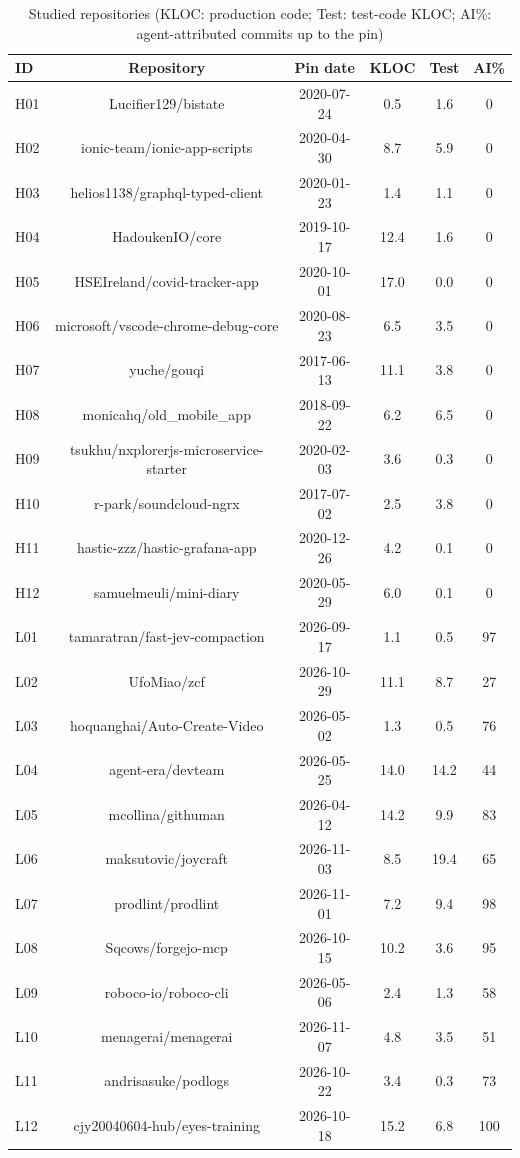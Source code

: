 \documentclass[10pt,conference]{IEEEtran}
\begin{document}
\begin{table}[t]
\caption{Studied repositories (KLOC: production code; Test: test-code KLOC; AI\%: agent-attributed commits up to the pin)}
\label{tab:dataset}
\centering
\scriptsize
\setlength{\tabcolsep}{2.5pt}
\begin{tabular}{lccccc}
\toprule
ID & Repository & Pin date & KLOC & Test & AI\% \\
\midrule
H01 & Lucifier129/bistate & 2020-07-24 & 0.5 & 1.6 & 0 \\
H02 & ionic-team/ionic-app-scripts & 2020-04-30 & 8.7 & 5.9 & 0 \\
H03 & helios1138/graphql-typed-client & 2020-01-23 & 1.4 & 1.1 & 0 \\
H04 & HadoukenIO/core & 2019-10-17 & 12.4 & 1.6 & 0 \\
H05 & HSEIreland/covid-tracker-app & 2020-10-01 & 17.0 & 0.0 & 0 \\
H06 & microsoft/vscode-chrome-debug-core & 2020-08-23 & 6.5 & 3.5 & 0 \\
H07 & yuche/gouqi & 2017-06-13 & 11.1 & 3.8 & 0 \\
H08 & monicahq/old\_mobile\_app & 2018-09-22 & 6.2 & 6.5 & 0 \\
H09 & tsukhu/nxplorerjs-microservice-starter & 2020-02-03 & 3.6 & 0.3 & 0 \\
H10 & r-park/soundcloud-ngrx & 2017-07-02 & 2.5 & 3.8 & 0 \\
H11 & hastic-zzz/hastic-grafana-app & 2020-12-26 & 4.2 & 0.1 & 0 \\
H12 & samuelmeuli/mini-diary & 2020-05-29 & 6.0 & 0.1 & 0 \\
L01 & tamaratran/fast-jev-compaction & 2026-09-17 & 1.1 & 0.5 & 97 \\
L02 & UfoMiao/zcf & 2026-10-29 & 11.1 & 8.7 & 27 \\
L03 & hoquanghai/Auto-Create-Video & 2026-05-02 & 1.3 & 0.5 & 76 \\
L04 & agent-era/devteam & 2026-05-25 & 14.0 & 14.2 & 44 \\
L05 & mcollina/githuman & 2026-04-12 & 14.2 & 9.9 & 83 \\
L06 & maksutovic/joycraft & 2026-11-03 & 8.5 & 19.4 & 65 \\
L07 & prodlint/prodlint & 2026-11-01 & 7.2 & 9.4 & 98 \\
L08 & Sqcows/forgejo-mcp & 2026-10-15 & 10.2 & 3.6 & 95 \\
L09 & roboco-io/roboco-cli & 2026-05-06 & 2.4 & 1.3 & 58 \\
L10 & menagerai/menagerai & 2026-11-07 & 4.8 & 3.5 & 51 \\
L11 & andrisasuke/podlogs & 2026-10-22 & 3.4 & 0.3 & 73 \\
L12 & cjy20040604-hub/eyes-training & 2026-10-18 & 15.2 & 6.8 & 100 \\
\bottomrule
\end{tabular}
\end{table}
\end{document}
